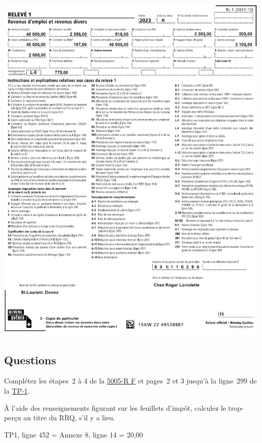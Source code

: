 \noindent
\includegraphics[width=\textwidth]{probleme/chapitre-3/RL1.png}


\subsection{Questions}
Complétez les étapes~2 à 4 de la \href{https://www.canada.ca/fr/agence-revenu/services/formulaires-publications/trousses-impot-toutes-annees-imposition/trousse-generale-impot-prestations/quebec/5005-r.html}{5005-R F} et pages~2 et 3 jusqu'à la ligne~299 de la \href{https://www.revenuquebec.ca/documents/fr/formulaires/tp/2023-12/TP-1.D%282023-12%29.pdf}{TP-1}.

\setcounter{question}{0}
\begin{question}
	À l'aide des renseignements figurant sur les feuillets d'impôt, calculez le trop-perçu au titre du RRQ, s'il y a lieu.
\end{question}
TP1, ligne 452 = Annexe 8, ligne 14 = 20,00

